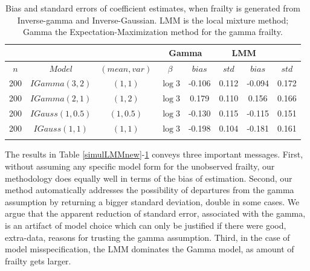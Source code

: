 \documentclass[graybox]{svmult}
\begin{document}
\begin{table}[h!]
\caption{Bias and standard errors of coefficient estimates, when frailty 
is generated from Inverse-gamma and Inverse-Gaussian. LMM is the local mixture method; Gamma the 
Expectation-Maximization method for the gamma frailty.}
\label{simulLMMnew_others}
\begin{center}
\begin{tabular}{c c c c c c c c}

\hline  
& & &\multicolumn{2}{c}{Gamma } & \multicolumn{2}{c}{LMM}\\ [0.3ex]
\hline
$n$ & $Model$ & $(mean,var)$&$\beta$ &  $bias$ & $std$ & $bias$ & $std$ \\ [0.3ex] 
\hline 
200 & $IGamma(3,2)$& $(1,1)$&  $\log{3}$ &-0.106 & 0.112 & -0.094 & 0.172\\ 
200 & $IGamma(2,1)$& $(1,2)$&  $\log{3}$ &0.179 & 0.110 & 0.156 & 0.166\\ 
200 & $IGauss(1,0.5)$ & $(1,0.5)$& $\log{3}$ &-0.130 & 0.115 & -0.115 &0.151  \\ 
200 & $IGauss(1,1)$ &$(1,1)$ & $\log{3}$ &-0.198  &0.104  & -0.181 &0.161 \\ 
\hline\\

\end{tabular}
\end{center}
\end{table}



The results in Table \ref{simulLMMnew}-\ref{simulLMMnew_others} conveys three important messages. First, without assuming any  specific
model form for the unobserved frailty, our methodology does equally well in terms of the bias of estimation.
Second, our method automatically addresses the possibility of departures from the gamma assumption by 
returning a bigger standard deviation, double in some cases. We argue that the apparent  reduction of standard error, associated with the gamma,  is an artifact of model choice which can only be justified if there were good, extra-data, reasons for trusting the gamma assumption. 
Third, in the case of model misspecification, the LMM dominates the Gamma model, as amount of  frailty  gets larger.
\end{document}
